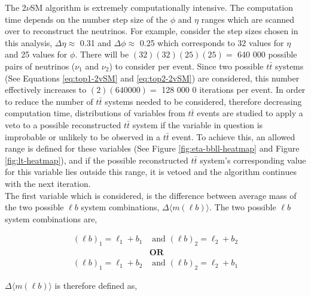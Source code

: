 The 2$\nu$SM algorithm is extremely computationally intensive. The computation time depends on the number step size of the $\phi$ and $\eta$ ranges which are scanned over to reconstruct the neutrinos. For example, consider the step sizes chosen in this analysis, $\Delta \eta \approx$ 0.31 and $\Delta \phi \approx$ 0.25 which corresponds to 32 values for $\eta$ and 25 values for $\phi$. There will be $(32)(32)(25)(25) = $ 640 000 possible pairs of neutrinos ($\nu_{1}$ and $\nu_{2}$) to consider per event. Since two possible $t\bar{t}$ systems (See Equations \ref{eq:top1-2vSM} and \ref{eq:top2-2vSM}) are considered, this number effectively increases to $(2)(640000) = $ 128 000 0 iterations per event. In order to reduce the number of $t\bar{t}$ systems needed to be considered, therefore decreasing computation time, distributions of variables from $t\bar{t}$ events are studied to apply a veto to a possible reconstructed $t\bar{t}$ system if the variable in question is improbable or unlikely to be observed in a $t\bar{t}$ event. To achieve this, an allowed range is defined for these variables (See Figure \ref{fig:eta-bbll-heatmap} and Figure \ref{fig:lt-heatmap}), and if the possible reconstructed $t\bar{t}$ system's corresponding value for this variable lies outside this range, it is vetoed and the algorithm continues with the next iteration.\\

The first variable which is considered, is the difference between average mass of the two possible $\ell b$ system combinations, $\Delta \langle m(\ell b)\rangle$. The two possible $\ell b$ system combinations are,

\begin{align}
    (\ell b)_{1} = \ell_{1} + b_{1} &\text{ and }  (\ell b)_{2}  = \ell_{2} + b_{2} \\
    &\textbf{OR}\nonumber\\ 
     (\ell b)_{1} = \ell_{1} + b_{2} &\text{ and }  (\ell b)_{2}  = \ell_{2} + b_{1} 
\end{align}

$\Delta \langle m(\ell b) \rangle$ is therefore defined as,

